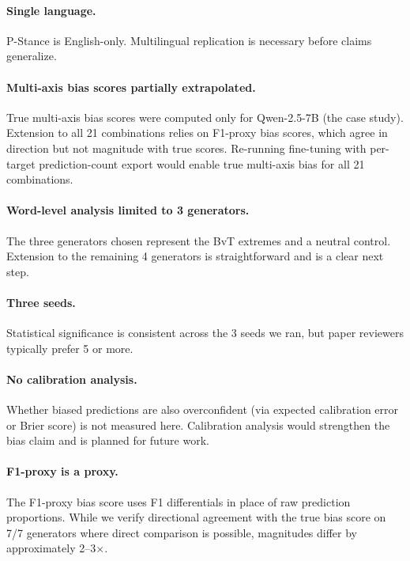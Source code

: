 \documentclass[11pt]{article}
\begin{document}
\paragraph{Single language.} P-Stance is English-only. Multilingual replication is necessary before claims generalize.

\paragraph{Multi-axis bias scores partially extrapolated.} True multi-axis bias scores were computed only for Qwen-2.5-7B (the case study). Extension to all 21 combinations relies on F1-proxy bias scores, which agree in direction but not magnitude with true scores. Re-running fine-tuning with per-target prediction-count export would enable true multi-axis bias for all 21 combinations.

\paragraph{Word-level analysis limited to 3 generators.} The three generators chosen represent the BvT extremes and a neutral control. Extension to the remaining 4 generators is straightforward and is a clear next step.

\paragraph{Three seeds.} Statistical significance is consistent across the 3 seeds we ran, but paper reviewers typically prefer 5 or more.

\paragraph{No calibration analysis.} Whether biased predictions are also overconfident (via expected calibration error or Brier score) is not measured here. Calibration analysis would strengthen the bias claim and is planned for future work.

\paragraph{F1-proxy is a proxy.} The F1-proxy bias score uses F1 differentials in place of raw prediction proportions. While we verify directional agreement with the true bias score on 7/7 generators where direct comparison is possible, magnitudes differ by approximately 2--3$\times$.
\end{document}
